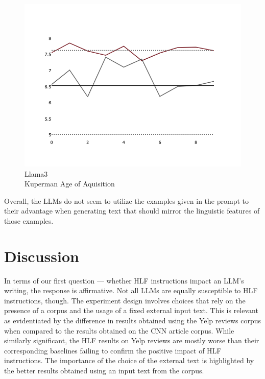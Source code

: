 \documentclass[11pt]{article}
\begin{document}
\begin{figure}[ht!]
\begin{minipage}{0.32\textwidth}
    \end{minipage}
    \hfill
    \begin{minipage}{0.32\textwidth}
        \includegraphics[width=\linewidth]{plots/prompt_2_ifd/prompt_2-llama3_70b-cnn_dailymail/prompt_2-llama3_70b-cnn_dailymail_a_kup_pw.png}
        \caption[center]{Llama3\\Kuperman Age of Aquisition}\label{fig-p2-ifd-llama3-a-kup-pw}
    \end{minipage}
\end{figure}

Overall, the LLMs do not seem to utilize the examples given in the prompt to
their advantage when generating text that should mirror the linguistic features
of those examples.

\section{Discussion}

In terms of our first question --- whether HLF instructions impact an LLM's
writing, the response is affirmative.
Not all LLMs are equally susceptible to HLF instructions, though.
The experiment design involves choices that rely on the presence of a corpus and
the usage of a fixed external input text.
This is relevant as evidentiated by the difference in results obtained using the
Yelp reviews corpus when compared to the results obtained on the CNN article
corpus.
While similarly significant, the HLF results on Yelp reviews are mostly worse
than their corresponding baselines failing to confirm the positive impact of HLF
instructions.
The importance of the choice of the external text is highlighted by the better
results obtained using an input text from the corpus.
\end{document}

